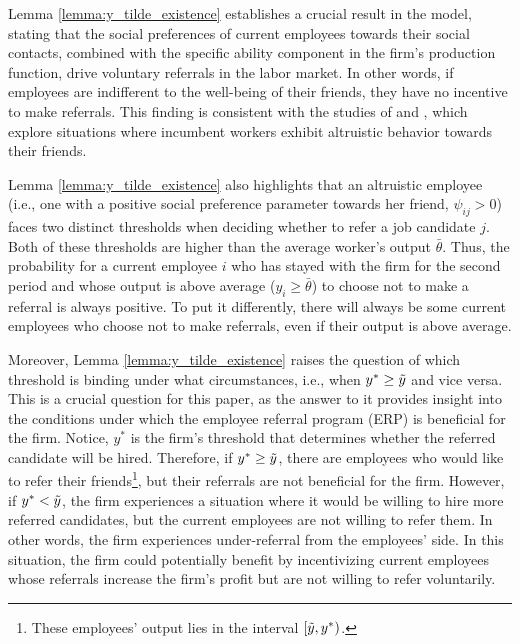 \documentclass[12pt]{article}
\begin{document}
Lemma \ref{lemma:y_tilde_existence} establishes a crucial result in the model, stating that the social preferences of current employees towards their social contacts, combined with the specific ability component in the firm's production function, drive voluntary referrals in the labor market. In other words, if employees are indifferent to the well-being of their friends, they have no incentive to make referrals. This finding is consistent with the studies of \cite{friebel2023employee} and \cite{bandiera2009social}, which explore situations where incumbent workers exhibit altruistic behavior towards their friends.

Lemma \ref{lemma:y_tilde_existence} also highlights that an altruistic employee (i.e., one with a positive social preference parameter towards her friend, $\psi_{ij} > 0$) faces two distinct thresholds when deciding whether to refer a job candidate $j$. Both of these thresholds are higher than the average worker's output $\bar{\theta}$. Thus, the probability for a current employee $i$ who has stayed with the firm for the second period and whose output is above average ($y_i \geq \bar{\theta}$) to choose not to make a referral is always positive. To put it differently, there will always be some current employees who choose not to make referrals, even if their output is above average. %

Moreover, Lemma \ref{lemma:y_tilde_existence} raises the question of which threshold is binding under what circumstances, i.e., when $y^* \geq \Tilde{y}$ and vice versa. This is a crucial question for this paper, as the answer to it provides insight into the conditions under which the employee referral program (ERP) is beneficial for the firm. Notice, $y^*$ is the firm's threshold that determines whether the referred candidate will be hired. Therefore, if $y^* \geq \Tilde{y}$, there are employees who would like to refer their friends\footnote{These employees' output lies in the interval $[\Tilde{y}, y^*)$.}, but their referrals are not beneficial for the firm. However, if $y^* < \Tilde{y}$, the firm experiences a situation where it would be willing to hire more referred candidates, but the current employees are not willing to refer them. In other words, the firm experiences under-referral from the employees' side. In this situation, the firm could potentially benefit by incentivizing current employees whose referrals increase the firm's profit but are not willing to refer voluntarily.
\end{document}
